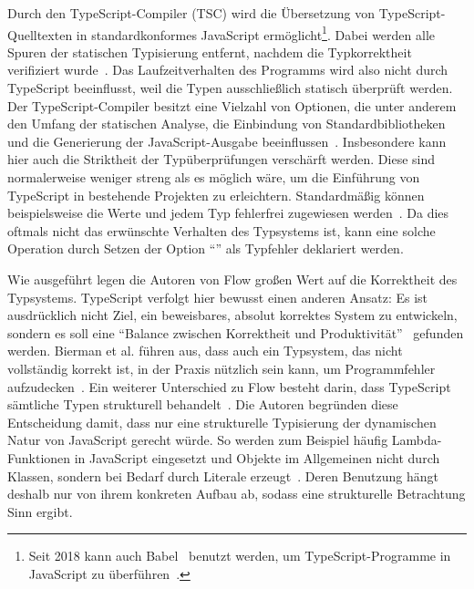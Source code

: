 Durch den TypeScript-Compiler (TSC) wird die Übersetzung von TypeScript-Quelltexten in standardkonformes JavaScript ermöglicht\footnote{Seit 2018 kann auch Babel~\autocite{BABEL} benutzt werden, um TypeScript-Programme in JavaScript zu überführen~\autocite{TYPESCRIPT:BABEL}.}. Dabei werden alle Spuren der statischen Typisierung entfernt, nachdem die Typkorrektheit verifiziert wurde~\autocite[3]{BIERMAN:2014}. Das Laufzeitverhalten des Programms wird also nicht durch TypeScript beeinflusst, weil die Typen ausschließlich statisch überprüft werden. Der TypeScript-Compiler besitzt eine Vielzahl von Optionen, die unter anderem den Umfang der statischen Analyse, die Einbindung von Standardbibliotheken und die Generierung der JavaScript-Ausgabe beeinflussen~\autocite{TSC:OPTIONS}. Insbesondere kann hier auch die Striktheit der Typüberprüfungen verschärft werden. Diese sind normalerweise weniger streng als es möglich wäre, um die Einführung von TypeScript in bestehende Projekten zu erleichtern. Standardmäßig können beispielsweise die Werte  und  jedem Typ fehlerfrei zugewiesen werden~\autocite{TSC:OPTIONS}. Da dies oftmals nicht das erwünschte Verhalten des Typsystems ist, kann eine solche Operation durch Setzen der Option \enquote{} als Typfehler deklariert werden.

Wie ausgeführt legen die Autoren von Flow großen Wert auf die Korrektheit des Typsystems. TypeScript verfolgt hier bewusst einen anderen Ansatz: Es ist ausdrücklich nicht Ziel, ein beweisbares, absolut korrektes System zu entwickeln, sondern es soll eine \enquote{Balance zwischen Korrektheit und Produktivität}~\autocite{TYPESCRIPT:DESIGN_GOALS} gefunden werden. Bierman et al. führen aus, dass auch ein Typsystem, das nicht vollständig korrekt ist, in der Praxis nützlich sein kann, um Programmfehler aufzudecken~\autocite[3]{BIERMAN:2014}. Ein weiterer Unterschied zu Flow besteht darin, dass TypeScript sämtliche Typen strukturell behandelt~\autocite[38]{TYPESCRIPT:SPEC}.
Die Autoren begründen diese Entscheidung damit, dass nur eine strukturelle Typisierung der dynamischen Natur von JavaScript gerecht würde. So werden zum Beispiel häufig Lambda-Funktionen in JavaScript eingesetzt und Objekte im Allgemeinen nicht durch Klassen, sondern bei Bedarf durch Literale erzeugt~\autocite[3]{BIERMAN:2014}. Deren Benutzung hängt deshalb nur von ihrem konkreten Aufbau ab, sodass eine strukturelle Betrachtung Sinn ergibt.

